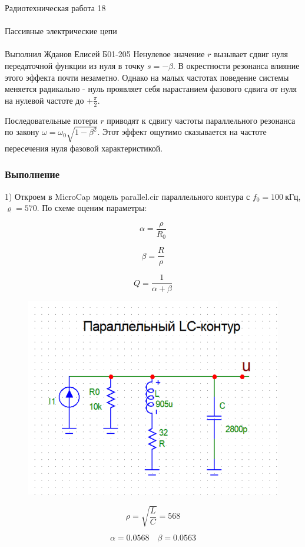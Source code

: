 \documentclass{astroedu-lab}
\begin{document}
\begin{problem}{\huge Радиотехническая работа 18\\\\Пассивные электрические цепи\\\\Выполнил Жданов Елисей Б01-205}
Ненулевое значение $r$ вызывает сдвиг нуля передаточной функции из нуля в точку $s=-\beta$. В окрестности резонанса влияние этого эффекта почти незаметно. Однако на малых частотах поведение системы меняется радикально - нуль проявляет себя нарастанием фазового сдвига от нуля на нулевой частоте до $+\frac{\pi}{2}$.

Последовательные потери $r$ приводят к сдвигу частоты параллельного резонанса по закону $\omega=\omega_0 \sqrt{1-\beta^2}$. Этот эффект ощутимо сказывается на частоте пересечения нуля фазовой характеристикой.

\subsubsection{Выполнение}

\newpage

1) Откроем в MicroCap модель parallel.cir параллельного контура с $f_0 = 100 \: \text{кГц}$, $\varrho = 570$. По схеме оценим параметры:

\[\alpha = \frac{\rho}{R_0}\]

\[\beta = \frac{R}{\rho}\]

\[Q = \frac{1}{\alpha + \beta}\]

\begin{figure}[!h]
	\centering
	\includegraphics[width=1\textwidth]{5_2.png}
	\label{fig:boiler}
\end{figure}

\[\rho = \sqrt{\frac{L}{C}} = 568\]

\[\alpha = 0.0568 \quad \beta = 0.0563\]


\end{problem}
\end{document}
